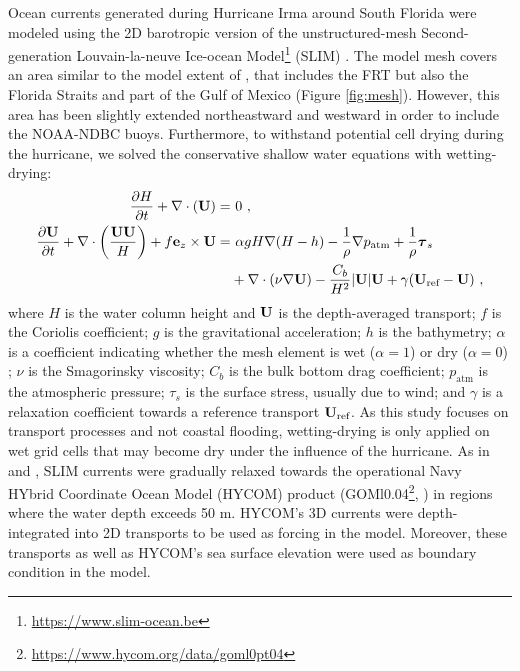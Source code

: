 Ocean currents generated during Hurricane Irma around South Florida were modeled using the 2D barotropic version of the unstructured-mesh Second-generation Louvain-la-neuve Ice-ocean Model\footnote{\url{https://www.slim-ocean.be}} (SLIM) \citep{lambrechts2008multi}. The model mesh covers an area similar to the model extent of \cite{dobbelaere2020coupled}, that includes the FRT but also the Florida Straits and part of the Gulf of Mexico (Figure \ref{fig:mesh}). However, this area has been slightly extended northeastward and westward in order to include the NOAA-NDBC buoys. Furthermore, to withstand potential cell drying during the hurricane, we solved the conservative shallow water equations with wetting-drying:
\begin{equation}
    \begin{split}
        \dfrac{\partial H}{\partial t} +\nabla\cdot(\mathbf{U}) =& ~0~, \\
        \dfrac{\partial \mathbf{U}}{\partial t}  + \nabla\cdot\left(\dfrac{\mathbf{U}\mathbf{U}}{H}\right) + f\mathbf{e}_z \times \mathbf{U} =& ~\alpha gH\nabla(H-h) - \dfrac{1}{\rho}\nabla p_\text{atm} + \dfrac{1}{\rho}\text{\boldmath$\tau$}_s \\
         &+\nabla\cdot(\nu\nabla\mathbf{U}) - \dfrac{C_b}{H^2}|\mathbf{U}|\mathbf{U} + \gamma(\mathbf{U}_\text{ref}-\mathbf{U})~,
    \end{split} \label{eq:slim}
\end{equation}
where $H$ is the water column height and $\mathbf{U}$ is the depth-averaged transport; $f$ is the Coriolis coefficient; $g$ is the gravitational acceleration; $h$ is the bathymetry; $\alpha$ is a coefficient indicating whether the mesh element is wet ($\alpha=1$) or dry ($\alpha=0$) \citep{le2020implicit}; $\nu$  is the Smagorinsky viscosity; $C_b$ is the bulk bottom drag coefficient; $p_\text{atm}$ is the atmospheric pressure; {\boldmath$\tau$}$_s$ is the surface stress, usually due to wind; and $\gamma$ is a relaxation coefficient towards a reference transport $\mathbf{U}_\text{ref}$. As this study focuses on transport processes and not coastal flooding, wetting-drying is only applied on wet grid cells that may become dry under the influence of the hurricane. As in \cite{frys2020fine} and \cite{dobbelaere2020coupled}, SLIM currents were gradually relaxed towards the operational Navy HYbrid Coordinate Ocean Model (HYCOM) product (GOMl0.04\footnote{\url{https://www.hycom.org/data/goml0pt04}}, \cite{chassignet2007hycom}) in regions where the water depth exceeds 50 m. HYCOM's 3D currents were depth-integrated into 2D transports to be used as forcing in the model. Moreover, these transports as well as HYCOM's sea surface elevation were used as boundary condition in the model.

